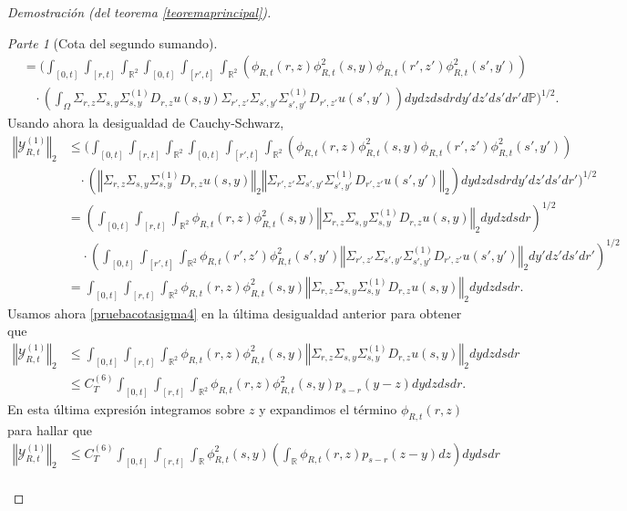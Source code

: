 \documentclass[letterpaper,twoside,12pt]{book}
\newcommand{\R}{\mathbb{R}}
\renewcommand{\P}{\mathbb{P}}
\newcommand{\1}{\mathds{1}}
\newcommand{\norm}[1]{\left\Vert #1 \right\Vert}
\theoremstyle{definition}
\theoremstyle{definition}
\theoremstyle{remark}
\newtheorem{proofpart}{Parte}
\theoremstyle{definition}
\theoremstyle{definition}
\theoremstyle{definition}
\theoremstyle{definition}
\theoremstyle{definition}
\begin{document}
\begin{proof}[Demostración (del teorema \ref{teoremaprincipal})]
\begin{proofpart}[Cota del segundo sumando]
\begin{align*}
   &=\Bigg(\int_{[0,t]}\int_{[r,t]}\int_{\R^2}\int_{[0,t]}\int_{[r',t]}\int_{\R^2}\left(\phi_{R,t}(r,z)\phi_{R,t}^2(s,y)\phi_{R,t}(r',z')\phi_{R,t}^2(s',y')\right)\\
   &\ \ \ \ \cdot \left(\int_\Omega\Sigma_{r,z}\Sigma_{s,y}\Sigma^{(1)}_{s,y}D_{r,z}u(s,y)\Sigma_{r',z'}\Sigma_{s',y'}\Sigma^{(1)}_{s',y'}D_{r',z'}u(s',y')\right) dy dz ds dr dy'dz'ds'dr'd\P\Bigg)^{1/2}.
 \end{align*}
 Usando ahora la desigualdad de Cauchy-Schwarz, 
 \begin{align*}
   \norm{\mathcal{Y}_{R,t}^{(1)}}_2&\leq \Bigg(\int_{[0,t]}\int_{[r,t]}\int_{\R^2}\int_{[0,t]}\int_{[r',t]}\int_{\R^2}\left(\phi_{R,t}(r,z)\phi_{R,t}^2(s,y)\phi_{R,t}(r',z')\phi_{R,t}^2(s',y')\right)\\
   &\ \ \ \ \cdot \left(\norm{\Sigma_{r,z}\Sigma_{s,y}\Sigma^{(1)}_{s,y}D_{r,z}u(s,y)}_2\norm{\Sigma_{r',z'}\Sigma_{s',y'}\Sigma^{(1)}_{s',y'}D_{r',z'}u(s',y')}_2\right) dy dz ds dr dy' dz' ds' dr'\Bigg)^{1/2}\\
   &=\left(\int_{[0,t]}\int_{[r,t]}\int_{\R^2}\phi_{R,t}(r,z)\phi_{R,t}^2(s,y)\norm{\Sigma_{r,z}\Sigma_{s,y}\Sigma^{(1)}_{s,y}D_{r,z}u(s,y)}_2dy dz ds dr\right)^{1/2}\\
   & \ \ \ \ \ \cdot \left(\int_{[0,t]}\int_{[r',t]}\int_{\R^2}\phi_{R,t}(r',z')\phi_{R,t}^2(s',y')\norm{\Sigma_{r',z'}\Sigma_{s',y'}\Sigma^{(1)}_{s',y'}D_{r',z'}u(s',y')}_2dy'dz'ds'dr'\right)^{1/2}\\
   &=\int_{[0,t]}\int_{[r,t]}\int_{\R^2}\phi_{R,t}(r,z)\phi_{R,t}^2(s,y)\norm{\Sigma_{r,z}\Sigma_{s,y}\Sigma^{(1)}_{s,y}D_{r,z}u(s,y)}_2dy dz ds dr.
 \end{align*}
 Usamos ahora \eqref{pruebacotasigma4} en la última desigualdad anterior para obtener que
 \begin{align*}
   \norm{\mathcal{Y}_{R,t}^{(1)}}_2&\leq\int_{[0,t]}\int_{[r,t]}\int_{\R^2}\phi_{R,t}(r,z)\phi_{R,t}^2(s,y)\norm{\Sigma_{r,z}\Sigma_{s,y}\Sigma^{(1)}_{s,y}D_{r,z}u(s,y)}_2dy dz ds dr\\
   &\leq C^{(6)}_T\int_{[0,t]}\int_{[r,t]}\int_{\R^2}\phi_{R,t}(r,z)\phi_{R,t}^2(s,y)p_{s-r}(y-z)dy dz ds dr.
\end{align*}
En esta última expresión integramos sobre $z$ y expandimos el término $\phi_{R,t}(r,z)$ para hallar que 
\begin{align*}
   \norm{\mathcal{Y}_{R,t}^{(1)}}_2&\leq C^{(6)}_T\int_{[0,t]}\int_{[r,t]}\int_{\R}\phi_{R,t}^2(s,y)\left(\int_\R\phi_{R,t}(r,z)p_{s-r}(z-y)dz\right)dy ds dr\\

\end{align*}
\end{proofpart}
\end{proof}
\end{document}
